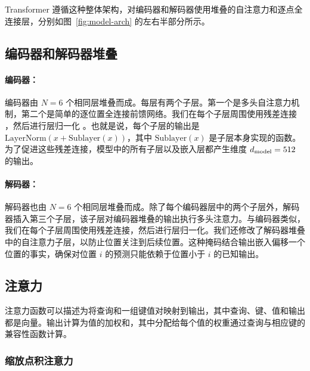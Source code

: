 Transformer 遵循这种整体架构，对编码器和解码器使用堆叠的自注意力和逐点全连接层，分别如图~\ref{fig:model-arch} 的左右半部分所示。

\subsection{编码器和解码器堆叠}

\paragraph{编码器：}编码器由 $N=6$ 个相同层堆叠而成。每层有两个子层。第一个是多头自注意力机制，第二个是简单的逐位置全连接前馈网络。我们在每个子层周围使用残差连接 \citep{he2016deep}，然后进行层归一化 \cite{layernorm2016}。也就是说，每个子层的输出是 $\mathrm{LayerNorm}(x + \mathrm{Sublayer}(x))$，其中 $\mathrm{Sublayer}(x)$ 是子层本身实现的函数。为了促进这些残差连接，模型中的所有子层以及嵌入层都产生维度 $d_{\text{model}}=512$ 的输出。

\paragraph{解码器：}解码器也由 $N=6$ 个相同层堆叠而成。除了每个编码器层中的两个子层外，解码器插入第三个子层，该子层对编码器堆叠的输出执行多头注意力。与编码器类似，我们在每个子层周围使用残差连接，然后进行层归一化。我们还修改了解码器堆叠中的自注意力子层，以防止位置关注到后续位置。这种掩码结合输出嵌入偏移一个位置的事实，确保对位置 $i$ 的预测只能依赖于位置小于 $i$ 的已知输出。


\subsection{注意力} \label{sec:attention}
注意力函数可以描述为将查询和一组键值对映射到输出，其中查询、键、值和输出都是向量。输出计算为值的加权和，其中分配给每个值的权重通过查询与相应键的兼容性函数计算。

\subsubsection{缩放点积注意力} \label{sec:scaled-dot-prod}

